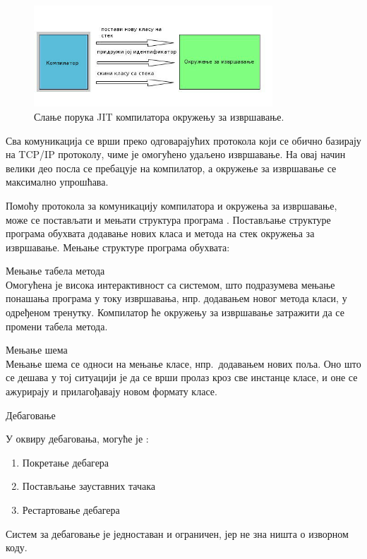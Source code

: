\documentclass[12pt,oneside]{memoir}
\begin{document}
\begin{figure}[!ht]
  \centering
  \includegraphics[width=0.8\textwidth]{compiler.jpg}
  \caption{Слање порука JIT компилатора окружењу за извршавање.}
  \label{fig:komunikacija}
\end{figure}

Сва комуникација се врши преко одговарајућих протокола који се обично базирају на TCP/IP протоколу, чиме је омогућено удаљено извршавање. На овај начин велики део посла се пребацује на компилатор, а окружење за извршавање се максимално упрошћава.

Помоћу протокола за комуникацију компилатора и окружења за извршавање, може се постављати и мењати структура програма \cite{Dartino}.
Постављање структуре програма обухвата додавање нових класа и метода на стек окружења за извршавање.
Мењање структуре програма обухвата:
\begin{description}
\item Мењање табела метода\\
Омогућена је висока интерактивност са системом, што подразумева мењање понашања програма у току извршавања, нпр. додавањем новог метода класи, у одређеном тренутку. Компилатор ће окружењу за извршавање затражити да се промени табела метода.
\item Мењање шема\\
Мењање шема се односи на мењање класе, нпр.~додавањем нових поља. Оно што се дешава у тој ситуацији је да се врши пролаз кроз све инстанце класе, и оне се ажурирају и прилагођавају новом формату класе.
\item Дебаговање

У оквиру дебаговања, могуће је \cite{Dartino}:
\begin{enumerate}
\item Покретање дебагера
\item Постављање зауставних тачака
\item Рестартовање дебагера
\end{enumerate}
Систем за дебаговање је једноставан и ограничен, јер не зна ништа о изворном коду.
\end{description}
\end{document}
